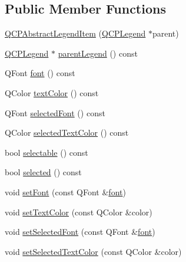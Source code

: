 \subsection*{Public Member Functions}
\begin{DoxyCompactItemize}
\item 
\mbox{\hyperlink{class_q_c_p_abstract_legend_item_afaff87610e8da0fa238ecf552872d774}{Q\+C\+P\+Abstract\+Legend\+Item}} (\mbox{\hyperlink{class_q_c_p_legend}{Q\+C\+P\+Legend}} $\ast$parent)
\item 
\mbox{\hyperlink{class_q_c_p_legend}{Q\+C\+P\+Legend}} $\ast$ \mbox{\hyperlink{class_q_c_p_abstract_legend_item_a15709a3f6b2ce3946261fe90422ae32e}{parent\+Legend}} () const
\item 
Q\+Font \mbox{\hyperlink{class_q_c_p_abstract_legend_item_a699b18e1d9e70372e51e75f462dbb643}{font}} () const
\item 
Q\+Color \mbox{\hyperlink{class_q_c_p_abstract_legend_item_a35b35fa697dcece86cf7e5818c0820b2}{text\+Color}} () const
\item 
Q\+Font \mbox{\hyperlink{class_q_c_p_abstract_legend_item_ace98814b31762578228f6b32111cd3c0}{selected\+Font}} () const
\item 
Q\+Color \mbox{\hyperlink{class_q_c_p_abstract_legend_item_a09540594509fb0074f3a1b39548e3bdc}{selected\+Text\+Color}} () const
\item 
bool \mbox{\hyperlink{class_q_c_p_abstract_legend_item_af054a668038bcd7e35a35a07d1e79a23}{selectable}} () const
\item 
bool \mbox{\hyperlink{class_q_c_p_abstract_legend_item_adf427dbb05d5f1a8e84c6abcb05becdf}{selected}} () const
\item 
void \mbox{\hyperlink{class_q_c_p_abstract_legend_item_a409c53455d8112f71d70c0c43eb10265}{set\+Font}} (const Q\+Font \&\mbox{\hyperlink{class_q_c_p_abstract_legend_item_a699b18e1d9e70372e51e75f462dbb643}{font}})
\item 
void \mbox{\hyperlink{class_q_c_p_abstract_legend_item_a6ebace6aaffaedcdab2d74e88acc2d1e}{set\+Text\+Color}} (const Q\+Color \&color)
\item 
void \mbox{\hyperlink{class_q_c_p_abstract_legend_item_a91db5aee48617a9d3206e61376807365}{set\+Selected\+Font}} (const Q\+Font \&\mbox{\hyperlink{class_q_c_p_abstract_legend_item_a699b18e1d9e70372e51e75f462dbb643}{font}})
\item 
void \mbox{\hyperlink{class_q_c_p_abstract_legend_item_a4d01d008ee1a5bfe9905b0397a421936}{set\+Selected\+Text\+Color}} (const Q\+Color \&color)
\item 

\end{DoxyCompactItemize}
